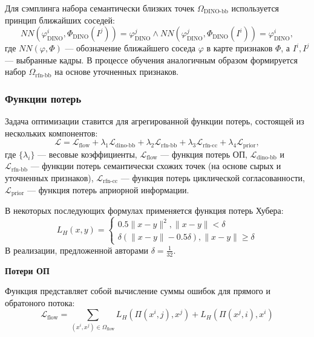 \documentclass[a4paper, 14pt]{extarticle}
\theoremstyle{definition}
\theoremstyle{plain}
\theoremstyle{remark}
\begin{document}
Для сэмплинга набора семантически близких точек $\Omega_{\text{DINO-bb}}$ используется принцип ближайших соседей:
\begin{equation}
	NN(\varphi_{\text{DINO}}^i, \Phi_{\text{DINO}}({I}^j)) = \varphi_{\text{DINO}}^j \land NN(\varphi_{\text{DINO}}^j, \Phi_{\text{DINO}}({I}^i)) = \varphi_{\text{DINO}}^i,
\end{equation}
где $NN(\varphi, \Phi)$ --- обозначение ближайшего соседа $\varphi$ в карте признаков $\Phi$, а $I^i, I^j$ --- выбранные кадры.
В процессе обучения аналогичным образом формируется набор $\Omega_{\text{rfn-bb}}$ на основе уточненных признаков.

\subsubsection{Функции потерь}
Задача оптимизации ставится для агрегированной функции потерь, состоящей из нескольких компонентов:
\begin{equation} \label{eq:loss}
	\mathcal{L} = \mathcal{L}_{\text{flow}} + \lambda_1 \mathcal{L}_{\text{dino-bb}} + \lambda_2 \mathcal{L}_{\text{rfn-bb}} + \lambda_3 \mathcal{L}_{\text{rfn-cc}} + \lambda_4 \mathcal{L}_{\text{prior}},
\end{equation}
где $\{\lambda_i\}$ --- весовые коэффициенты, $\mathcal{L}_{\text{flow}}$ --- функция потерь ОП, $\mathcal{L}_{\text{dino-bb}}$ и $\mathcal{L}_{\text{rfn-bb}}$ --- функции потерь семантически схожих точек (на основе сырых и уточненных признаков), $\mathcal{L}_{\text{rfn-cc}}$ --- функция потерь циклической согласованности, $\mathcal{L}_{\text{prior}}$ --- функция потерь априорной информации.

В некоторых последующих формулах применяется функция потерь Хубера:
\begin{equation}
	L_H(x, y) = \begin{cases}
		0.5\|x-y\|^2, \|x - y\| < \delta \\
		\delta(\|x-y\| - 0.5\delta), \|x-y\| \ge \delta
	\end{cases}
\end{equation}
В реализации, предложенной авторами $\delta=\frac{1}{32}$.

\textbf{Потери ОП}

Функция представляет собой вычисление суммы ошибок для прямого и обратоного потока:
\begin{equation}
	\mathcal{L}_{\text{flow}} = \sum_{(x^i, x^j) \in \Omega_{\text{flow}}} L_H(\Pi(x^i, j), x^j) + L_H(\Pi(x^j, i), x^i)
\end{equation}
\end{document}
